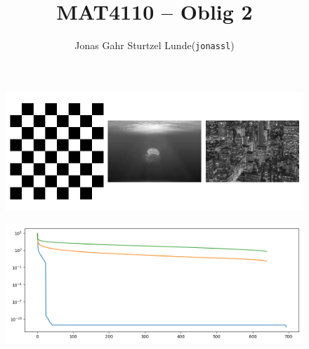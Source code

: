 \documentclass[12p,a4paper]{article}
\begin{document}
\title{MAT4110 -- Oblig 2}
\author{
    \begin{tabular}{r l}
        Jonas Gahr Sturtzel Lunde & (\texttt{jonassl})
    \end{tabular}}

\maketitle

\hspace{10cm}

\begin{figure}[H]
    \centering
    \includegraphics[width=1.0\linewidth]{../figs/original_img.png}
\end{figure}

\begin{figure}[H]
    \centering
    \includegraphics[width=1.0\linewidth]{../figs/singular_values.png}
\end{figure}
\end{document}
